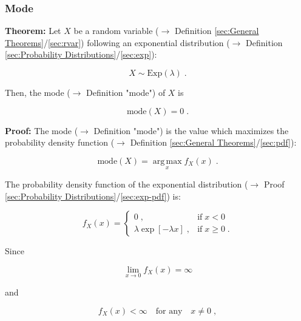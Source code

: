 \documentclass[a4paper,12pt,twoside]{book}
\begin{document}
\subsubsection[\textbf{Mode}]{Mode} \label{sec:exp-mode}
\setcounter{equation}{0}

\textbf{Theorem:} Let $X$ be a random variable ($\rightarrow$ Definition \ref{sec:General Theorems}/\ref{sec:rvar}) following an exponential distribution ($\rightarrow$ Definition \ref{sec:Probability Distributions}/\ref{sec:exp}):

\begin{equation} \label{eq:exp-mode-exp}
X \sim \mathrm{Exp}(\lambda) \; .
\end{equation}

Then, the mode ($\rightarrow$ Definition "mode") of $X$ is

\begin{equation} \label{eq:exp-mode-exp-mode}
\mathrm{mode}(X) = 0 \; .
\end{equation}


\vspace{1em}
\textbf{Proof:}  The mode ($\rightarrow$ Definition "mode") is the value which maximizes the probability density function ($\rightarrow$ Definition \ref{sec:General Theorems}/\ref{sec:pdf}):

\begin{equation} \label{eq:exp-mode-mode}
\mathrm{mode}(X) = \operatorname*{arg\,max}_x f_X(x) \; .
\end{equation}

The probability density function of the exponential distribution ($\rightarrow$ Proof \ref{sec:Probability Distributions}/\ref{sec:exp-pdf}) is:

\begin{equation} \label{eq:exp-mode-exp-pdf}
f_X(x) = \left\{
\begin{array}{rl}
0 \; , & \text{if} \; x < 0 \\
\lambda \exp[-\lambda x] \; , & \text{if} \; x \geq 0 \; .
\end{array}
\right.
\end{equation}

Since

\begin{equation} \label{eq:exp-mode-exp-pdf-eq0}
\lim_{x \to 0} f_X(x) = \infty
\end{equation}

and

\begin{equation} \label{eq:exp-mode-exp-pdf-neq0}
f_X(x) < \infty \quad \text{for any} \quad x \neq 0 \; ,
\end{equation}
\end{document}
